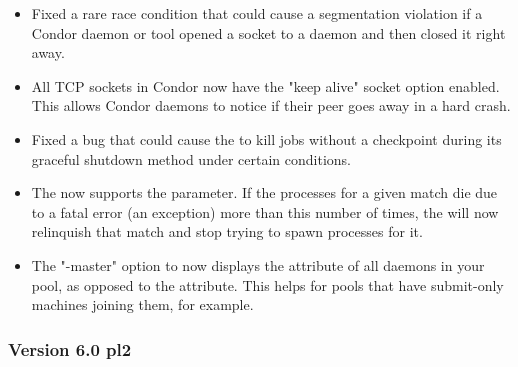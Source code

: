 \begin{itemize}
\item Fixed a rare race condition that could cause a segmentation
violation if a Condor daemon or tool opened a socket to a daemon and
then closed it right away.

\item All TCP sockets in Condor now have the "keep alive" socket option
enabled.
This allows Condor daemons to notice if their peer goes away in a hard
crash.

\item Fixed a bug that could cause the  to kill jobs
without a checkpoint during its graceful shutdown method under certain
conditions.

\item The  now supports the
 parameter.
If the  processes for a given match die due to a fatal
error (an exception) more than this number of times, the
 will now relinquish that match and stop trying to
spawn  processes for it.

\item The "-master" option to  now displays the 
attribute of all  daemons in your pool, as opposed
to the  attribute.
This helps for pools that have submit-only machines joining them, for
example.

\end{itemize}

\subsubsection{\label{sec:New-6-0-pl2}Version 6.0 pl2}

